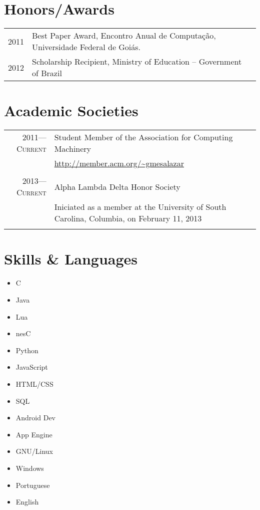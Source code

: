 \documentclass[a4paper,10pt]{article}
\begin{document}
\section{Honors/Awards}
\begin{tabular}{rll}
  2011 & Best Paper Award, Encontro Anual de Computação, Universidade Federal de Goiás.\\
  2012 & Scholarship Recipient, Ministry of Education -- Government of Brazil\\
\end{tabular}

\section{Academic Societies}

\begin{tabular}{r|p{11cm}}
  \textsc{2011---Current}
  & Student Member of the Association for Computing Machinery\\
  & \footnotesize{\url{http://member.acm.org/~gmesalazar}}
  \\\multicolumn{2}{c}{}\\

  \textsc{2013---Current}
  & Alpha Lambda Delta Honor Society\\
  & \footnotesize{Iniciated as a member at the University of South Carolina, Columbia, on February 11, 2013}\\
  \multicolumn{2}{c}{}\\
  
\end{tabular}

\section{Skills \& Languages}
\begin{multicols}{3}
  \begin{itemize}
    \renewcommand{\labelitemi}{\textcolor{lightg}{\symbol{"00BB}}}
    \setlength{\itemsep}{1pt}
    \setlength{\parskip}{0pt}
    \setlength{\parsep}{0pt}
  \item C \hfill \threenotes 
  \item Java \hfill \threenotes
  \item Lua \hfill \twonotes
  \item nesC \hfill \twonotes
  \item Python \hfill \twonotes
  \item JavaScript \hfill \twonotes
  \item HTML/CSS \hfill \threenotes
  \item SQL \hfill \twonotes
  \item Android Dev \hfill \twonotes
  \item App Engine \hfill \twonotes
  \item GNU/Linux \hfill \threenotes
  \item Windows \hfill \threenotes
  \item Portuguese \hfill \fournotes
  \item English \hfill \threenotes
  \end{itemize} 
\end{multicols}
\end{document}
